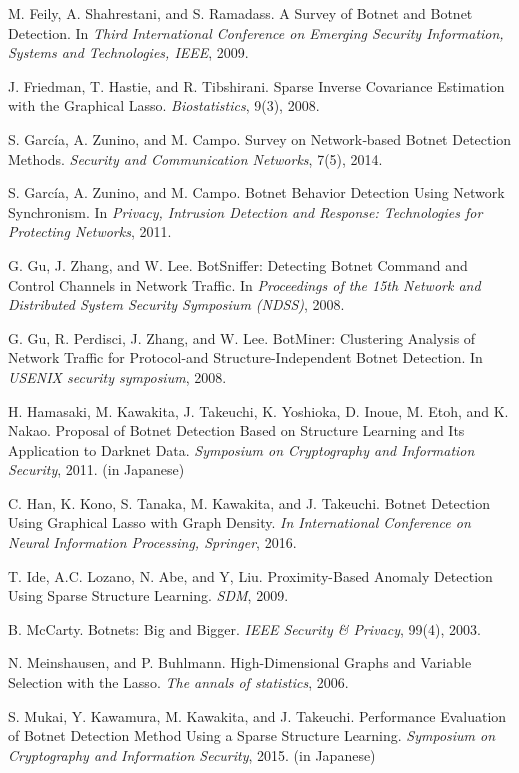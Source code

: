 \documentclass{sig-alternate-10pt}
\begin{document}
\begin{thebibliography}{25}
M. Feily, A. Shahrestani, and S. Ramadass. A Survey of Botnet and Botnet Detection. In {\it Third International Conference on Emerging Security Information, Systems and Technologies, IEEE}, 2009.

J. Friedman, T. Hastie, and R. Tibshirani. Sparse Inverse Covariance Estimation with the Graphical Lasso. {\it Biostatistics}, 9(3), 2008.

S. Garc\'{i}a, A. Zunino, and M. Campo. Survey on Network‐based Botnet Detection Methods. {\it Security and Communication Networks}, 7(5), 2014.

S. Garc\'{i}a, A. Zunino, and M. Campo. Botnet Behavior Detection Using Network Synchronism. In {\it Privacy, Intrusion Detection and Response: Technologies for Protecting Networks}, 2011.

G. Gu, J. Zhang, and W. Lee. BotSniffer: Detecting Botnet Command and Control Channels in Network Traffic. In {\it Proceedings of the 15th Network and Distributed System Security Symposium (NDSS)}, 2008.

G. Gu, R. Perdisci, J. Zhang, and W. Lee. BotMiner: Clustering Analysis of Network Traffic for Protocol-and Structure-Independent Botnet Detection. In {\it USENIX security symposium}, 2008.

H. Hamasaki, M. Kawakita, J. Takeuchi, K. Yoshioka, D. Inoue, M. Etoh, and K. Nakao. Proposal of Botnet Detection Based on Structure Learning and Its Application to Darknet Data. {\it Symposium on Cryptography and Information Security}, 2011. (in Japanese)

C. Han, K. Kono, S. Tanaka, M. Kawakita, and J. Takeuchi. Botnet Detection Using Graphical Lasso with Graph Density. {\it In International Conference on Neural Information Processing, Springer}, 2016.

T. Ide, A.C. Lozano, N. Abe, and Y, Liu. Proximity-Based Anomaly Detection Using Sparse Structure Learning. {\it SDM}, 2009.

B. McCarty. Botnets: Big and Bigger. {\it IEEE Security \& Privacy}, 99(4), 2003.

N. Meinshausen, and P. Buhlmann. High-Dimensional Graphs and Variable Selection with the Lasso. {\it The annals of statistics}, 2006.

S. Mukai, Y. Kawamura, M. Kawakita, and J. Takeuchi. Performance Evaluation of Botnet Detection Method Using a Sparse Structure Learning. {\it Symposium on Cryptography and Information Security}, 2015. (in Japanese)


\end{thebibliography}
\end{document}
